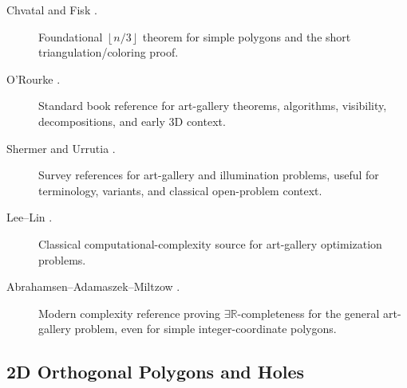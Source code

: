 \documentclass[11pt]{article}
\newcommand{\floor}[1]{\left\lfloor #1 \right\rfloor}
\begin{document}
\begin{description}
  \item[Chvatal \cite{Chvatal1975} and Fisk \cite{Fisk1978}.]
  Foundational $\floor{n/3}$ theorem for simple polygons and the short
  triangulation/coloring proof.

  \item[O'Rourke \cite{ORourke1987}.]
  Standard book reference for art-gallery theorems, algorithms, visibility,
  decompositions, and early 3D context.

  \item[Shermer \cite{Shermer1992} and Urrutia \cite{Urrutia2000}.]
  Survey references for art-gallery and illumination problems, useful for
  terminology, variants, and classical open-problem context.

  \item[Lee--Lin \cite{LeeLin1986}.]
  Classical computational-complexity source for art-gallery optimization
  problems.

  \item[Abrahamsen--Adamaszek--Miltzow \cite{AbrahamsenAdamaszekMiltzow2022}.]
  Modern complexity reference proving $\exists\mathbb{R}$-completeness for the
  general art-gallery problem, even for simple integer-coordinate polygons.
\end{description}

\subsection*{2D Orthogonal Polygons and Holes}
\end{document}
